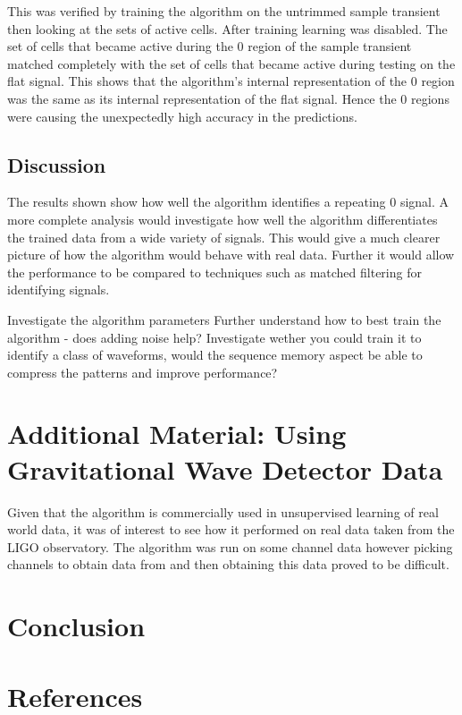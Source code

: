 \documentclass[a4paper]{jpconf}
\begin{document}
		This was verified by training the algorithm on the untrimmed sample transient then looking at the sets of active cells. After training learning was disabled. The set of cells that became active during the 0 region of the sample transient matched completely with the set of cells that became active during testing on the flat signal. This shows that the algorithm's internal representation of the 0 region was the same as its internal representation of the flat signal. Hence the 0 regions were causing the unexpectedly high accuracy in the predictions.
		 
	\subsection{Discussion}
		The results shown show how well the algorithm identifies a repeating 0 signal. A more complete analysis would investigate how well the algorithm differentiates the trained data from a wide variety of signals. This would give a much clearer picture of how the algorithm would behave with real data. Further it would allow the performance to be compared to techniques such as matched filtering for identifying signals.
		
		Investigate the algorithm parameters
		Further understand how to best train the algorithm - does adding noise help?
		Investigate wether you could train it to identify a class of waveforms, would the sequence memory aspect be able to compress the patterns and improve performance?
\section{Additional Material: Using Gravitational Wave Detector Data}
	Given that the algorithm is commercially used in unsupervised learning of real world data, it was of interest to see how it performed on real data taken from the LIGO observatory. The algorithm was run on some channel data however picking channels to obtain data from and then obtaining this data proved to be difficult.

\section{Conclusion}
	
\section*{References} 
\end{document}
